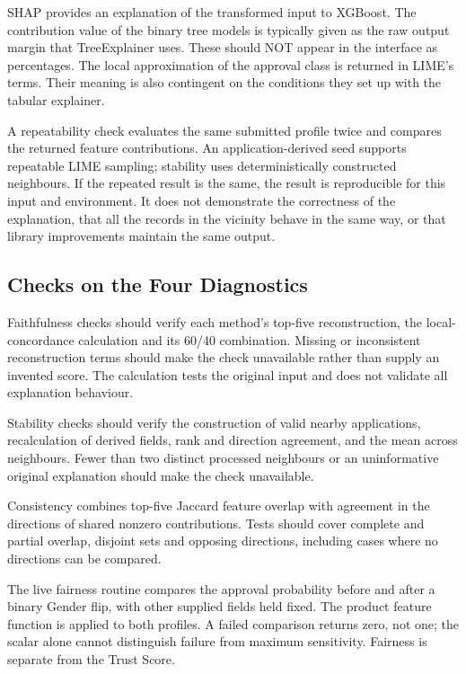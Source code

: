 SHAP provides an explanation of the transformed input to XGBoost. The contribution value of the binary tree models is typically given as the raw output margin that TreeExplainer uses. These should NOT appear in the interface as percentages. The local approximation of the approval class is returned in LIME's terms. Their meaning is also contingent on the conditions they set up with the tabular explainer.

A repeatability check evaluates the same submitted profile twice and compares the returned feature contributions. An application-derived seed supports repeatable LIME sampling; stability uses deterministically constructed neighbours. If the repeated result is the same, the result is reproducible for this input and environment. It does not demonstrate the correctness of the explanation, that all the records in the vicinity behave in the same way, or that library improvements maintain the same output.

\subsection{Checks on the Four Diagnostics}
Faithfulness checks should verify each method's top-five reconstruction, the local-concordance calculation and its 60/40 combination. Missing or inconsistent reconstruction terms should make the check unavailable rather than supply an invented score. The calculation tests the original input and does not validate all explanation behaviour.

Stability checks should verify the construction of valid nearby applications, recalculation of derived fields, rank and direction agreement, and the mean across neighbours. Fewer than two distinct processed neighbours or an uninformative original explanation should make the check unavailable.

Consistency combines top-five Jaccard feature overlap with agreement in the directions of shared nonzero contributions. Tests should cover complete and partial overlap, disjoint sets and opposing directions, including cases where no directions can be compared.

The live fairness routine compares the approval probability before and after a binary Gender flip, with other supplied fields held fixed. The product feature function is applied to both profiles. A failed comparison returns zero, not one; the scalar alone cannot distinguish failure from maximum sensitivity. Fairness is separate from the Trust Score.

